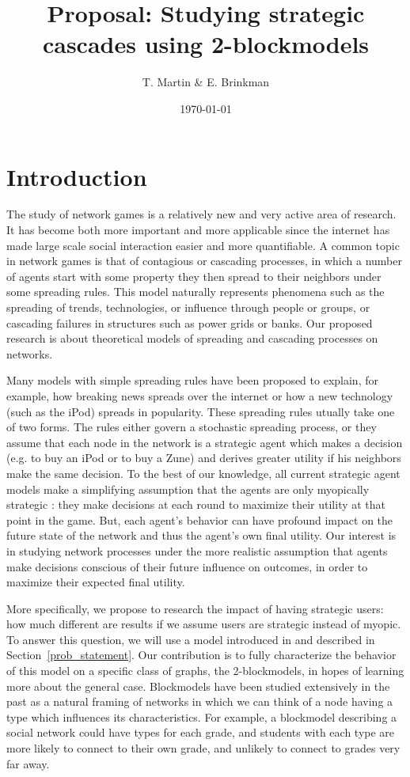 \documentclass{article}
\title{Proposal: Studying strategic cascades using 2-blockmodels}
\author{T. Martin \& E. Brinkman}
\date{\today}
\begin{document}
\maketitle

\section{Introduction}
\label{intro}

The study of network games is a relatively new and very active area of research. It has become both more important and more applicable since the internet has made large scale social interaction easier and more quantifiable. A common topic in network games is that of contagious or cascading processes, in which a number of agents start with some property they then spread to their neighbors under some spreading rules. This model naturally represents phenomena such as the spreading of trends, technologies, or influence through people or groups, or cascading failures in structures such as power grids or banks. Our proposed research is about theoretical models of spreading and cascading processes on networks.

Many models with simple spreading rules have been proposed \cite{Arthur89, Morris00, Watts02} to explain, for example, how breaking news spreads over the internet or how a new technology (such as the iPod) spreads in popularity. These spreading rules utually take one of two forms. The rules either govern a stochastic spreading process, or they assume that each node in the network is a strategic agent which makes a decision (e.g. to buy an iPod or to buy a Zune) and derives greater utility if his neighbors make the same decision. To the best of our knowledge, all current strategic agent models make a simplifying assumption that the agents are only myopically strategic \cite{Chierichetti12}: they make decisions at each round to maximize their utility at that point in the game. But, each agent's behavior can have profound impact on the future state of the network and thus the agent's own final utility. Our interest is in studying network processes under the more realistic assumption that agents make decisions conscious of their future influence on outcomes, in order to maximize their expected final utility.

More specifically, we propose to research the impact of having strategic users: how much different are results if we assume users are strategic instead of myopic. To answer this question, we will use a model introduced in \cite{Chierichetti12} and described in Section~\ref{prob_statement}. Our contribution is to fully characterize the behavior of this model on a specific class of graphs, the 2-blockmodels, in hopes of learning more about the general case. Blockmodels have been studied extensively in the past \cite{Wang87, Snijders97} as a natural framing of networks in which we can think of a node having a type which influences its characteristics. For example, a blockmodel describing a social network could have types for each grade, and students with each type are more likely to connect to their own grade, and unlikely to connect to grades very far away.
\end{document}
